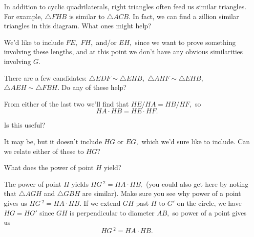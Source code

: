 


In addition to cyclic quadrilaterals, right triangles often feed us similar triangles. For example, $\triangle FHB$ is similar to $\triangle ACB.$  In fact, we can find a zillion similar triangles in this diagram. What ones might help?

We'd like to include $FE,$ $FH,$ and/or $EH,$ since we want to prove something involving these lengths, and at this point we don't have any obvious similarities involving $G.$

There are a few candidates: $\triangle EDF \sim \triangle EHB,$ $\triangle AHF \sim \triangle EHB,$ $\triangle AEH \sim \triangle FBH. $ Do any of these help?


From either of the last two we'll find that $HE/HA = HB/HF,$ so $$HA\cdot HB = HE\cdot HF.$$

Is this useful?

It may be, but it doesn't include $HG$ or $EG,$ which we'd sure like to include. Can we relate either of these to $HG?$


What does the power of point $H$ yield?



The power of point $H$ yields $HG\,^2 = HA\cdot HB,$  (you could also get here by noting that $\triangle AGH$ and $\triangle GBH$ are similar). Make sure you see why power of a point gives us $HG\,^2 = HA\cdot HB.$  If we extend $GH$ past $H$ to $G'$ on the circle, we have $HG = HG'$ since $GH$ is perpendicular to diameter $AB,$ so power of a point gives us $$HG\,^2 = HA\cdot HB.$$

